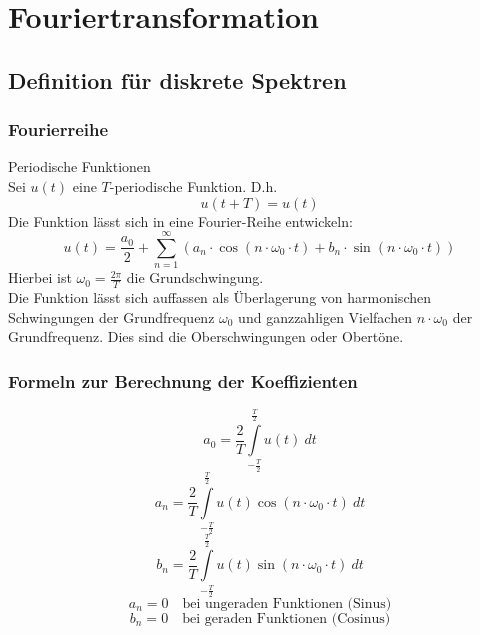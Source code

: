 



\chapter{Fouriertransformation}
\section{Definition für diskrete Spektren}

\subsection{Fourierreihe}
Periodische Funktionen\\
Sei $u(t)$ eine $T$-periodische Funktion. D.h. 
\[ u(t + T) = u(t) \]
Die Funktion lässt sich in eine Fourier-Reihe entwickeln: 
\[ u(t) = \frac{a_0}{2} + \sum\limits_{n = 1}^{\infty} 
(a_n \cdot \cos(n \cdot \omega_0 \cdot t) 
+ b_n \cdot \sin(n \cdot \omega_0 \cdot t)) \]
Hierbei ist $\omega_0 = \frac{2 \pi}{T}$ die Grundschwingung. \\
Die Funktion lässt sich auffassen als Überlagerung von harmonischen 
Schwingungen der Grundfrequenz $\omega_0$ und ganzzahligen Vielfachen 
$n \cdot \omega_0$ der Grundfrequenz. Dies sind die Oberschwingungen oder 
Obertöne. \\

\subsection{Formeln zur Berechnung der Koeffizienten}
\[ a_0 = \frac{2}{T} \int\limits_{-\frac{T}{2}}^{\frac{T}{2}} u(t) ~ dt \]
\[ a_n = \frac{2}{T} \int\limits_{-\frac{T}{2}}^{\frac{T}{2}} u(t) 
\cos(n \cdot \omega_0 \cdot t) ~ dt \]
\[ b_n = \frac{2}{T} \int\limits_{-\frac{T}{2}}^{\frac{T}{2}} u(t) 
\sin(n \cdot \omega_0 \cdot t) ~ dt \]
\[ a_n = 0 \quad \text{bei ungeraden Funktionen (Sinus)}\]
\[ b_n = 0 \quad \text{bei geraden Funktionen (Cosinus)}\]

